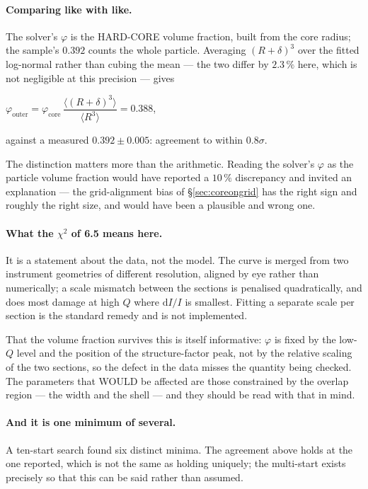 \documentclass[11pt,a4paper]{article}
\begin{document}
\paragraph{Comparing like with like.} The solver's $\varphi$ is the
HARD-CORE volume fraction, built from the core radius; the sample's $0.392$
counts the whole particle. Averaging $(R+\delta)^3$ over the fitted
log-normal rather than cubing the mean --- the two differ by $2.3\,\%$ here,
which is not negligible at this precision --- gives

\begin{center}
$\varphi_{\mathrm{outer}} = \varphi_{\mathrm{core}}\,
\dfrac{\langle (R+\delta)^3\rangle}{\langle R^3\rangle} = 0.388$,
\end{center}

against a measured $0.392 \pm 0.005$: agreement to within $0.8\sigma$.

The distinction matters more than the arithmetic. Reading the solver's
$\varphi$ as the particle volume fraction would have reported a $10\,\%$
discrepancy and invited an explanation --- the grid-alignment bias of
\S\ref{sec:coreongrid} has the right sign and roughly the right size, and
would have been a plausible and wrong one.

\paragraph{What the $\chi^2$ of 6.5 means here.} It is a statement about the
data, not the model. The curve is merged from two instrument geometries of
different resolution, aligned by eye rather than numerically; a scale
mismatch between the sections is penalised quadratically, and does most
damage at high $Q$ where $\mathrm{d}I/I$ is smallest. Fitting a separate
scale per section is the standard remedy and is not implemented.

That the volume fraction survives this is itself informative: $\varphi$ is
fixed by the low-$Q$ level and the position of the structure-factor peak, not
by the relative scaling of the two sections, so the defect in the data misses
the quantity being checked. The parameters that WOULD be affected are those
constrained by the overlap region --- the width and the shell --- and they
should be read with that in mind.

\paragraph{And it is one minimum of several.} A ten-start search found six
distinct minima. The agreement above holds at the one reported, which is not
the same as holding uniquely; the multi-start exists precisely so that this
can be said rather than assumed.
\end{document}

